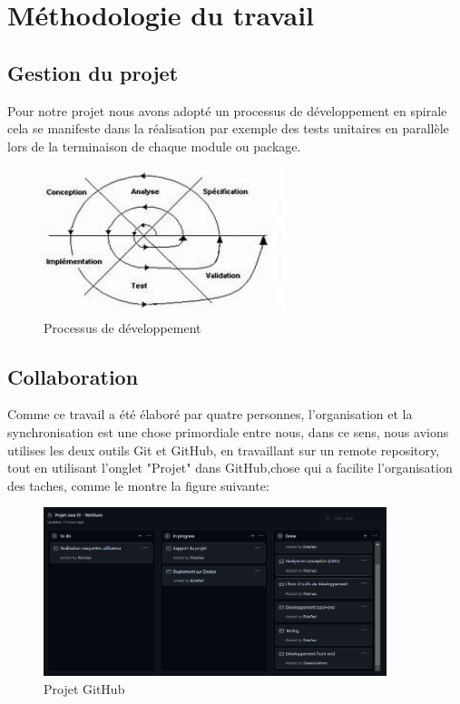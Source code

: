 \chapter{Méthodologie du travail}
\section{Gestion du projet}
Pour notre projet nous avons adopté un processus de développement en spirale cela se manifeste dans la réalisation par exemple des tests unitaires en parallèle lors de la terminaison de chaque module ou package.

\begin{figure}[!h]
\begin{center}
\includegraphics[width=7cm]{proc.png}
\caption{Processus de développement}
\end{center}
\end{figure}
\section{Collaboration}
Comme ce travail a été élaboré par quatre personnes, l'organisation et la synchronisation est une chose primordiale entre nous, dans ce sens, nous avions utilises les deux outils Git et GitHub, en travaillant sur un remote repository, tout en utilisant l'onglet "Projet" dans GitHub,chose qui a facilite l'organisation des taches, comme le montre la figure suivante:
\begin{figure}[!h]
\begin{center}
\includegraphics[width=10cm]{projethub.png}
\caption{Projet GitHub}
\end{center}
\end{figure}

